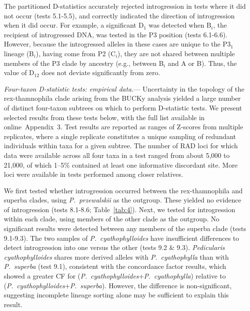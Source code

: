 \documentclass[12pt,letterpaper]{article}
\renewcommand{\subsubsection}[1]{%
\vspace{2ex}
\noindent
\textit{#1.}---}
\begin{document}
The partitioned D-statistics accurately rejected introgression in
tests where it did not occur (tests 5.1-5.5), and correctly indicated
the direction of introgression when it did occur.  For example, a
significant D$_1$ was detected when B$_i$, the recipient of
introgressed DNA, was tested in the P3 position (tests 6.1-6.6). 
However, because the introgressed alleles in these cases are unique to 
the P3$_1$ lineage (B$_i$), having come from P2 (C$_i$), they are not shared 
between multiple members of the P3 clade by ancestry (e.g., between B$_i$ and A or B). 
Thus, the value of D$_{12}$ does not deviate significantly from zero.

\subsubsection{Four-taxon D-statistic tests: empirical data}
Uncertainty in the topology of the rex-thamnophila clade arising from
the BUCKy analysis yielded a large number of distinct four-taxon
subtrees on which to perform D-statistic tests. We present selected
results from these tests below, with the full list available in
online~Appendix~3. Test results are reported as ranges of Z-scores from
multiple replicates, where a single replicate constitutes a unique
sampling of redundant individuals within taxa for a given subtree. The
number of RAD loci for which data were available across all four taxa
in a test ranged from about 5,000 to 21,000, of which 1--5\%
contained at least one informative discordant site. More loci were
available in tests performed among closer relatives.

We first tested whether introgression occurred between the
rex-thamnophila and superba clades, using \emph{P.~przewalskii} as the
outgroup. These yielded no evidence of introgression (tests 8.1-8.6;
Table~\ref{tab:4}). Next, we tested for introgression within each
clade, using members of the other clade as the outgroup. No
significant results were detected between any members of the superba
clade (tests 9.1-9.3).  The two samples of
\emph{P.~cyathophylloides} have insufficient differences to detect
introgression into one versus the other (tests 9.2 \& 9.3).
\emph{Pedicularis cyathophylloides} shares more derived alleles with
\emph{P.~cyathophylla} than with \emph{P.~superba} (test 9.1),
consistent with the concordance factor results, which showed a
greater CF for (\emph{P.~cyathophylloides}+\emph{P.~cyathophylla})
relative to (\emph{P.~cyathophylloides}+\emph{P.~superba}).
However, the difference is non-significant, suggesting incomplete
lineage sorting alone may be sufficient to explain this result. 
\end{document}
